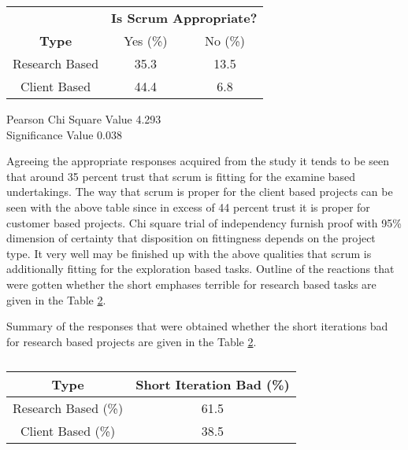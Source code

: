 \begin{table}[htbp]
	\caption{}
	\begin{center}
		\renewcommand\arraystretch{2}
		\begin{tabular}{|c|c|c|}
			\hline
			\textbf{}&\multicolumn{2}{c|}{\textbf{Is Scrum Appropriate?}}
			\\ \cline{2-3}
			\textbf{Type} & Yes (\%) & No (\%)
			\\ \hline
			Research Based & 35.3 & 13.5
			\\ \hline
			Client Based & 44.4 & 6.8
			\\ \hline
		\end{tabular}
	\end{center}
Pearson Chi Square Value  4.293 
\\ Significance Value 0.038
\label{table:scrum}
\end{table}

Agreeing the appropriate responses acquired from the study it tends to be seen  that around 35 percent trust that scrum is fitting for the examine based undertakings. The way that scrum is proper for the client based projects can be seen with the above table since in excess of 44 percent trust it is proper for customer based projects. Chi square trial of independency furnish proof with 95\% dimension of certainty that disposition on fittingness depends on the project type. It very well may be finished up with the above qualities that scrum is additionally fitting for the exploration based tasks. Outline of the reactions that were gotten whether the short emphases terrible for research based tasks are given in the Table \ref{table:shortIteration}.

Summary of the responses that were obtained whether the short iterations bad for research based projects are given in the Table \ref{table:shortIteration}.

\begin{table}[htbp]
	\caption{}
	\begin{center}
		\renewcommand\arraystretch{2}
		\begin{tabular}{|c|c|}
			\hline
			\textbf{Type} & \textbf{Short Iteration Bad (\%)}
			\\ \hline
			Research Based (\%) & 61.5
			\\ \hline
			Client Based (\%) & 38.5
			\\ \hline
		\end{tabular}
	\end{center}
\label{table:shortIteration}
\end{table}

